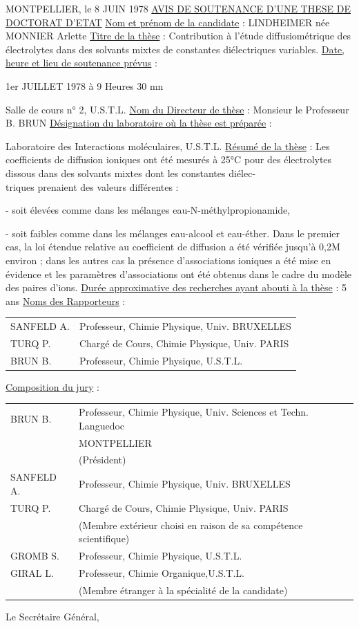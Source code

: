 MONTPELLIER, le 8 JUIN 1978
\uline{AVIS DE SOUTENANCE D'UNE THESE DE DOCTORAT D'ETAT}
\uline{Nom et prénom de la candidate} : LINDHEIMER née MONNIER Arlette
\uline{Titre de la thèse} : Contribution à l'étude diffusiométrique des électrolytes dans des solvants mixtes de constantes diélectriques variables.
\uline{Date, heure et lieu de soutenance prévus} :

1er JUILLET 1978 à 9 Heures 30 mn

Salle de cours n° 2, U.S.T.L.
\uline{Nom du Directeur de thèse} : Monsieur le Professeur B. BRUN
\uline{Désignation du laboratoire où la thèse est préparée} :

Laboratoire des Interactions moléculaires, U.S.T.L.
\uline{Résumé de la thèse} : Les coefficients de diffusion ioniques ont été mesurés à 25°C pour des électrolytes dissous dans des solvants mixtes dont les constantes diélec-\\
triques prenaient des valeurs différentes :

- soit élevées comme dans les mélanges eau-N-méthylpropionamide,

- soit faibles comme dans les mélanges eau-alcool et eau-éther.
Dans le premier cas, la loi étendue relative au coefficient de diffusion a été vérifiée jusqu'à 0,2M environ ; dans les autres cas la présence d'associations ioniques a été mise en évidence et les paramètres d'associations ont été obtenus dans le cadre du modèle des paires d'ions.
\uline{Durée approximative des recherches ayant abouti à la thèse} : 5 ans
\uline{Noms des Rapporteurs} :

\begin{tabular}{ll}
SANFELD A. & Professeur, Chimie Physique, Univ. BRUXELLES\\
TURQ P. & Chargé de Cours, Chimie Physique, Univ. PARIS\\
BRUN B. & Professeur, Chimie Physique, U.S.T.L.
\end{tabular}
\uline{Composition du jury} :

\begin{tabular}{lp{.74\linewidth}}
BRUN B. & Professeur, Chimie Physique, Univ. Sciences et Techn. Languedoc\\
& MONTPELLIER\\
& (Président)\\
SANFELD A. & Professeur, Chimie Physique, Univ. BRUXELLES\\
TURQ P. & Chargé de Cours, Chimie Physique, Univ. PARIS\\
& (Membre extérieur choisi en raison de sa compétence scientifique)\\
GROMB S. & Professeur, Chimie Physique, U.S.T.L.\\
GIRAL L. & Professeur, Chimie Organique,U.S.T.L.\\
& (Membre étranger à la spécialité de la candidate)
\end{tabular}
Le Secrétaire Général,


